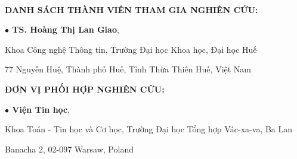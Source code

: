 \newpage
\thispagestyle{empty}
~

\textbf{DANH SÁCH THÀNH VIÊN THAM GIA NGHIÊN CỨU:}

\textbf{$\bullet$ TS. Hoàng Thị Lan Giao}, 
\vspace{-1.0ex}

Khoa Công nghệ Thông tin, Trường Đại học Khoa học, Đại học Huế
\vspace{-1.0ex}

77 Nguyễn Huệ, Thành phố Huế, Tỉnh Thừa Thiên Huế, Việt Nam

\vspace{3.0ex}
\textbf{ĐƠN VỊ PHỐI HỢP NGHIÊN CỨU:}

\textbf{$\bullet$ Viện Tin học},
\vspace{-1.0ex}

Khoa Toán - Tin học và  Cơ học, Trường Đại học Tổng hợp Vác-xa-va, Ba Lan

\vspace{-1.0ex}
Banacha 2, 02-097 Warsaw, Poland
\cleardoublepage

%

